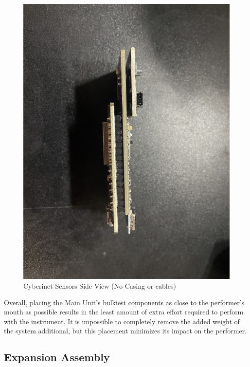 \begin{center}
    \begin{figure}
        \centering
        \includegraphics[scale=0.05]{diagrams/PCBs/cyberinetThin.JPG}
        \caption{Cyberinet Sensors Side View (No Casing or cables)}
        \label{fig:Cyberinetside}
    \end{figure}
\end{center}


Overall, placing the Main Unit's bulkiest components as close to the performer's mouth as possible results in the least amount of extra effort required to perform with the instrument. It is impossible to completely remove the added weight of the system additional, but this placement minimizes its impact on the performer.


\subsection{Expansion Assembly}

